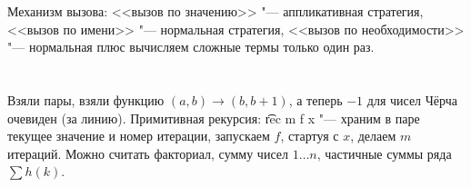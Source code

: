 Механизм вызова: <<вызов по значению>> "--- аппликативная стратегия, <<вызов по имени>> "--- нормальная стратегия,
<<вызов по необходимости>> "--- нормальная плюс вычисляем сложные термы только один раз.

\section{} %
Взяли пары, взяли функцию $(a, b) \to (b, b+1)$, а теперь $-1$ для чисел Чёрча очевиден (за линию).
Примитивная рекурсия: \t{rec m f x} "--- храним в паре текущее значение и номер итерации,
запускаем $f$, стартуя с $x$, делаем $m$ итераций.
Можно считать факториал, сумму чисел $1\dots n$, частичные суммы ряда $\sum h(k)$.
